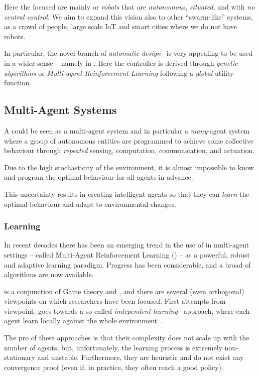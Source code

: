 \documentclass[11pt]{article}
\begin{document}
Here the focused are mainly or \textit{robots} that are \emph{autonomous}, \emph{situated}, and with \emph{no central control}. We aim to expand this vision also to other ``swarm-like'' systems, as a crowd of people, large scale IoT and smart cities where we do not have robots. 

In particular, the novel branch of \textit{automatic design}~\cite{DBLP:journals/firai/FrancescaB16} is very appealing to be used in a wider sense -- namely in \cpsw{}. Here the controller is derived through \textit{genetic algorithms} or \textit{Multi-agent Reinforcement Learning} following a \textit{global} utility function. 
\subsection{Multi-Agent Systems}
A \cpsw{} could be seen as a multi-agent system and in particular a \emph{many}-agent system where a group of autonomous entities are programmed to achieve some collective behaviour through \emph{repeated} sensing, computation, communication, and actuation.

Due to the high stochasticity of the environment, it is almost impossible to know and program the optimal behaviour for all agents in advance.

This uncertainty results in creating intelligent agents so that they can \emph{learn} the optimal behaviour and adapt to environmental changes.
\subsubsection{Learning}
In recent decades there has been an emerging trend in the use of \rl{} 
in multi-agent settings -- called Multi-Agent Reinforcement Learning (\marl{}) -- as a powerful, robust and adaptive learning paradigm.
%
Progress has been considerable, and a broad of algorithms are now available.

\marl{} is a conjunction of Game theory and \rl{}, 
 and there are several (even orthogonal) viewpoints on which researchers have been focused.
First attempts from \rl{} viewpoint, 
 goes towards a so-called \textit{independent learning}~\cite{DBLP:journals/tsmc/BusoniuBS08} approach, where each agent learn locally against the whole environment~\cite{DBLP:conf/icml/Tan93}.

The pro of these approaches is that their complexity does not scale up with the number of agents, 
 but, unfortunately, the learning process is extremely non-stationary and unstable.
% 
Furthermore, they are heuristic and do not exist any convergence proof (even if, in practice, they often reach a good policy).
\end{document}
